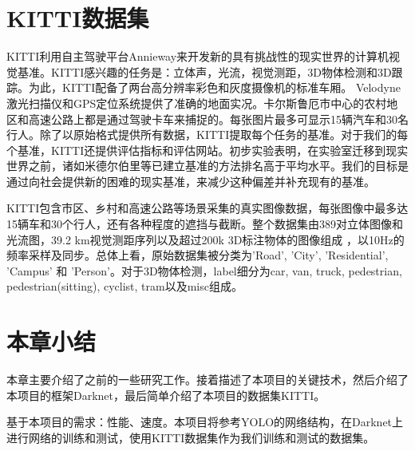 \section{KITTI数据集}{
	KITTI\cite{KITTI}利用自主驾驶平台Annieway来开发新的具有挑战性的现实世界的计算机视觉基准。KITTI感兴趣的任务是：立体声，光流，视觉测距，3D物体检测和3D跟踪。为此，KITTI配备了两台高分辨率彩色和灰度摄像机的标准车厢。 Velodyne激光扫描仪和GPS定位系统提供了准确的地面实况。卡尔斯鲁厄市中心的农村地区和高速公路上都是通过驾驶卡车来捕捉的。每张图片最多可显示15辆汽车和30名行人。除了以原始格式提供所有数据，KITTI提取每个任务的基准。对于我们的每个基准，KITTI还提供评估指标和评估网站。初步实验表明，在实验室迁移到现实世界之前，诸如米德尔伯里等已建立基准的方法排名高于平均水平。我们的目标是通过向社会提供新的困难的现实基准，来减少这种偏差并补充现有的基准。

	KITTI包含市区、乡村和高速公路等场景采集的真实图像数据，每张图像中最多达15辆车和30个行人，还有各种程度的遮挡与截断。整个数据集由389对立体图像和光流图，39.2 km视觉测距序列以及超过200k 3D标注物体的图像组成 ，以10Hz的频率采样及同步。总体上看，原始数据集被分类为’Road’, ’City’, ’Residential’, ’Campus’ 和 ’Person’。对于3D物体检测，label细分为car, van, truck, pedestrian, pedestrian(sitting), cyclist, tram以及misc组成。
}

\section{本章小结}{
	本章主要介绍了之前的一些研究工作。接着描述了本项目的关键技术，然后介绍了本项目的框架Darknet，最后简单介绍了本项目的数据集KITTI。

	基于本项目的需求：性能、速度。本项目将参考YOLO的网络结构，在Darknet上进行网络的训练和测试，使用KITTI数据集作为我们训练和测试的数据集。
}
